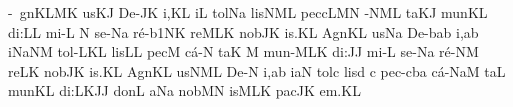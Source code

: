 

\gregorianCclef
{}
\Internote
\nosolesmescustos
\initiumgregorianum
{}%
\sgn {}-{\ gn}\pes KL\clivis MK\egn
\sgn {}us\clivis KJ\egn
\spatium
\sgn D{e}-\pes JK\egn
\sgn {}i,\punctum K\augmentum L\egn
\spatium
\Asteriscus
\divisiominima
\spatium
{}i{}\punctum L\egn
\spatium
\sgn t{o}l\pes Na\egn
\sgn lis\climacus NML\egn
\spatium
\sgn pe{cc}\Salicus LMN\egn
{}-\climacus NML\egn
\sgn ta{}\clivis KJ\egn
\spatium
\sgn m{u}n\epiphonus KL\egn
\sgn di:\punctum L\augmentum L\egn
\spatium
\divisiominor
\spatium
\sgn mi-\punctum L\egn
\custos N
\lineaproxima
\sgn se-\pes Na\egn
\sgn r{\'e}-\episem b1\clivis NK\egn
\sgn re{}\climacus MLK\egn
\spatium
\sgn n{o}b\pes JK\egn
\sgn {}i{s.}\punctum K\augmentum L\egn
\spatium
\divisiofinalis
\spatium
\sgn {}A{gn}\pes KL\egn
\sgn {}us\pes Na\egn
\spatium
\sgn D{e}-\bmolle b\pes ab\egn
\sgn {}i,\punctum a\augmentum b\egn
\spatium
\Asteriscus
\divisiominima
\spatium
{}i{}\pessubbipunctis NaNM\egn
\spatium
\sgn t{o}{l-}\porrectus LKL\egn
\sgn lis\punctum L\augmentum L\egn
\spatium
\sgn pec\punctum M\egn
\sgn c{\'a}-\punctum N\egn
\sgn ta{}\punctum K\egn
\spatium
\custos M
\lineaproxima
\sgn m{u}{n-}\virga M\spatiumparvum\punctuminclinatumparvum L\nonspatium\punctuminclinatumparvum K\egn
\sgn di:\punctum J\augmentum J\egn
\spatium
\divisiominor
\spatium
\sgn mi-\punctum L\egn
\sgn se-\pes Na\egn
\sgn r{\'e}-\clivis NM\egn
\sgn re{}\clivis LK\egn
\spatium
\sgn n{o}b\pes JK\egn
\sgn {}i{s.}\punctum K\augmentum L\egn
\spatium
\divisiofinalis
\spatium
\sgn {}A{gn}\pes KL\egn
\sgn {}us\climacus NML\egn
\spatium
\sgn D{e}-\punctum N\egn
\sgn {}i,\punctum a\augmentum b\egn
\spatium
\Asteriscus
\divisiominima
\spatium
{}i{}\clivis aN\egn
\spatium
\sgn t{o}l\punctum c\egn
\sgn lis\punctum d\egn
\spatium
\custos c
\lineaproxima
\sgn pe{c-}\climacus cba\egn
\sgn c{\'a}-\torculus NaM\egn
\sgn ta{}\punctum L\egn
\spatium
\sgn m{u}n\epiphonus KL\egn
\sgn di:\climacus LKJ\augmentum J\egn
\spatium
\divisiominor
\spatium
\sgn d{o}n\punctum L\egn
\sgn {}a{}\pes Na\egn
\spatium
\sgn n{o}b\pes MN\egn
\sgn {}is\climacus MLK\egn
\spatium
\sgn p{a}c\pes JK\egn
\sgn {}e{m.}\punctum K\augmentum L\egn
\spatium
\Finisgregoriana
